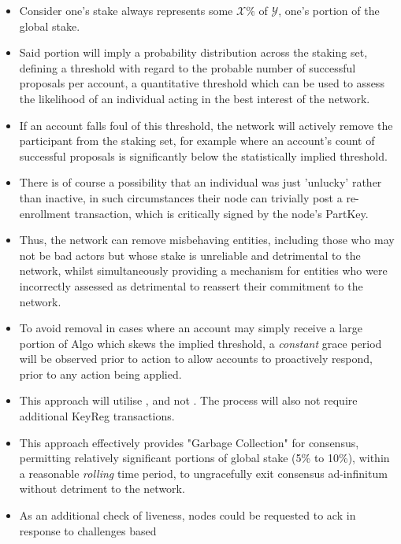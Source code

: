 \documentclass[11pt,a4paper]{article}
\begin{document}
\begin{itemize}
    \item Consider one's stake always represents some $\mathcal{X}\%$ of $\mathcal{Y}$, one's portion of the global 
          stake.
    \item Said portion will imply a probability distribution across the staking set, defining a threshold with regard to 
          the probable number of successful proposals per account, a quantitative threshold which can be used to assess 
          the likelihood of an individual acting in the best interest of the network.
    \item If an account falls foul of this threshold, the network will actively remove the participant from the staking
          set, for example where an account's count of successful proposals is significantly below the statistically 
          implied threshold.
    \item There is of course a possibility that an individual was just 'unlucky' rather than inactive, in such 
          circumstances their node can trivially post a re-enrollment transaction, which is critically signed by the 
          node's \gls{PartKey}.
    \item Thus, the network can remove misbehaving entities, including those who may not be bad actors but whose stake 
          is unreliable and detrimental to the network, whilst simultaneously providing a mechanism for entities who
          were incorrectly assessed as detrimental to reassert their commitment to the network.
    \item To avoid removal in cases where an account may simply receive a large portion of Algo which skews the implied 
          threshold, a \emph{constant} grace period will be observed prior to action to allow accounts to proactively
          respond, prior to any action being applied.
    \item This approach will utilise , and not . The process will
          also not require additional \gls{KeyReg} transactions.
    \item This approach effectively provides "Garbage Collection" for consensus, permitting relatively significant 
          portions of global stake (5\% to 10\%), within a reasonable \emph{rolling} time period, to ungracefully exit 
          consensus ad-infinitum without detriment to the network.
    \item As an additional check of liveness, nodes could be requested to ack in response to challenges based 

\end{itemize}
\end{document}
